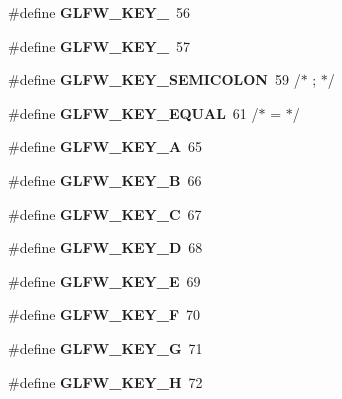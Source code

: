 \begin{DoxyCompactItemize}
\#define {\bfseries G\+L\+F\+W\+\_\+\+K\+E\+Y\+\_}~56
\item 
\mbox{\label{group__keys_ga2924cb5349ebbf97c8987f3521c44f39}} 
\#define {\bfseries G\+L\+F\+W\+\_\+\+K\+E\+Y\+\_}~57
\item 
\mbox{\label{group__keys_ga84233de9ee5bb3e8788a5aa07d80af7d}} 
\#define {\bfseries G\+L\+F\+W\+\_\+\+K\+E\+Y\+\_\+\+S\+E\+M\+I\+C\+O\+L\+ON}~59  /$\ast$ ; $\ast$/
\item 
\mbox{\label{group__keys_gae1a2de47240d6664423c204bdd91bd17}} 
\#define {\bfseries G\+L\+F\+W\+\_\+\+K\+E\+Y\+\_\+\+E\+Q\+U\+AL}~61  /$\ast$ = $\ast$/
\item 
\mbox{\label{group__keys_ga03e842608e1ea323370889d33b8f70ff}} 
\#define {\bfseries G\+L\+F\+W\+\_\+\+K\+E\+Y\+\_\+A}~65
\item 
\mbox{\label{group__keys_ga8e3fb647ff3aca9e8dbf14fe66332941}} 
\#define {\bfseries G\+L\+F\+W\+\_\+\+K\+E\+Y\+\_\+B}~66
\item 
\mbox{\label{group__keys_ga00ccf3475d9ee2e679480d540d554669}} 
\#define {\bfseries G\+L\+F\+W\+\_\+\+K\+E\+Y\+\_\+C}~67
\item 
\mbox{\label{group__keys_ga011f7cdc9a654da984a2506479606933}} 
\#define {\bfseries G\+L\+F\+W\+\_\+\+K\+E\+Y\+\_\+D}~68
\item 
\mbox{\label{group__keys_gabf48fcc3afbe69349df432b470c96ef2}} 
\#define {\bfseries G\+L\+F\+W\+\_\+\+K\+E\+Y\+\_\+E}~69
\item 
\mbox{\label{group__keys_ga5df402e02aca08444240058fd9b42a55}} 
\#define {\bfseries G\+L\+F\+W\+\_\+\+K\+E\+Y\+\_\+F}~70
\item 
\mbox{\label{group__keys_gae74ecddf7cc96104ab23989b1cdab536}} 
\#define {\bfseries G\+L\+F\+W\+\_\+\+K\+E\+Y\+\_\+G}~71
\item 
\mbox{\label{group__keys_gad4cc98fc8f35f015d9e2fb94bf136076}} 
\#define {\bfseries G\+L\+F\+W\+\_\+\+K\+E\+Y\+\_\+H}~72

\end{DoxyCompactItemize}
